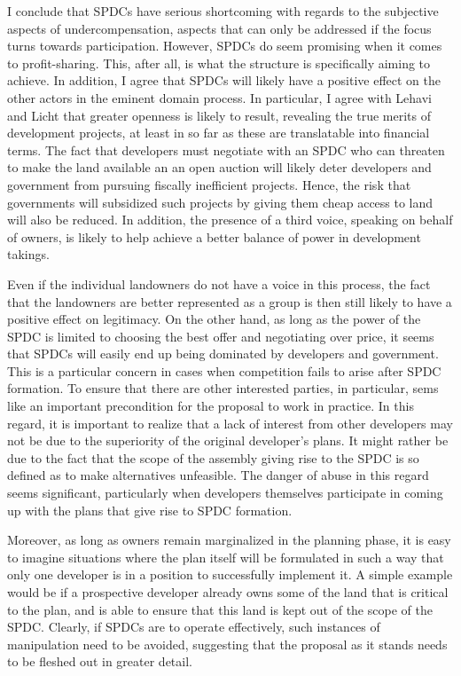 \documentclass[12pt,a4paper]{book} %
\begin{document}
I conclude that SPDCs have serious shortcoming with regards to the subjective aspects of undercompensation, aspects that can only be addressed if the focus turns towards participation. However, SPDCs do seem promising when it comes to profit-sharing. This, after all, is what the structure is specifically aiming to achieve. In addition, I agree that SPDCs will likely have a positive effect on the other actors in the eminent domain process. In particular, I agree with Lehavi and Licht that greater openness is likely to result, revealing the true merits of development projects, at least in so far as these are translatable into financial terms. The fact that developers must negotiate with an SPDC who can threaten to make the land available an an open auction will likely deter developers and government from pursuing fiscally inefficient projects. Hence, the risk that governments will subsidized such projects by giving them cheap access to land will also be reduced. In addition, the presence of a third voice, speaking on behalf of owners, is likely to help achieve a better balance of power in development takings. 

Even if the individual landowners do not have a voice in this process, the fact that the landowners are better represented as a group is then still likely to have a positive effect on legitimacy. On the other hand, as long as the power of the SPDC is limited to choosing the best offer and negotiating over price, it seems that SPDCs will easily end up being dominated by developers and government. This is a particular concern in cases when competition fails to arise after SPDC formation. To ensure that there are other interested parties, in particular, sems like an important precondition for the proposal to work in practice. In this regard, it is important to realize that a lack of interest from other developers may not be due to the superiority of the original developer's plans. It might rather be due to the fact that the scope of the assembly giving rise to the SPDC is so defined as to make alternatives unfeasible. The danger of abuse in this regard seems significant, particularly when developers themselves participate in coming up with the plans that give rise to SPDC formation. 

Moreover, as long as owners remain marginalized in the planning phase, it is easy to imagine situations where the plan itself will be formulated in such a way that only one developer is in a position to successfully implement it. A simple example would be if a prospective developer already owns some of the land that is critical to the plan, and is able to ensure that this land is kept out of the scope of the SPDC. Clearly, if SPDCs are to operate effectively, such instances of manipulation need to be avoided, suggesting that the proposal as it stands needs to be fleshed out in greater detail.
\end{document}
